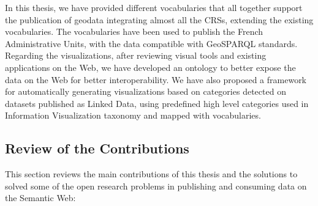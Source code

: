 In this thesis, we have provided different vocabularies that all together support the publication of geodata integrating almost all the CRSs, extending the existing vocabularies. The vocabularies have been used to publish the French Administrative Units, with the data compatible with GeoSPARQL standards. Regarding the visualizations, after reviewing visual tools and existing applications on the Web, we have developed an ontology to better expose the data on the Web for better interoperability. We have also proposed a framework for  automatically generating visualizations based on categories detected on datasets published as Linked Data, using predefined high level categories used in Information Visualization taxonomy and mapped with vocabularies. 

\subsection{Review of the Contributions}
This section reviews the main contributions of this thesis and the solutions to solved some of the open research problems in publishing and consuming data on the Semantic Web:

